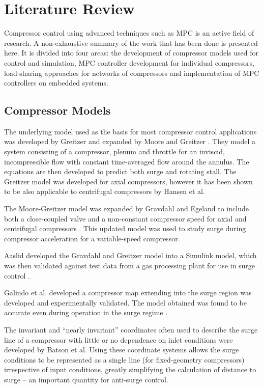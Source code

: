 \chapter{Literature Review}
Compressor control using advanced techniques such as MPC is an active field of research. 
A non-exhaustive summary of the work that has been done is presented here.
It is divided into four areas: the development of compressor models used for control and simulation, MPC controller development for individual compressors, load-sharing approaches for networks of compressors and implementation of MPC controllers on embedded systems. 

\section{Compressor Models}

The underlying model used as the basis for most compressor control applications was developed by Greitzer \cite{Greitzer1976} and expanded by Moore and Greitzer \cite{Moore1985}.
They model a system consisting of a compressor, plenum and throttle for an inviscid, incompressible flow with constant time-averaged flow around the annulus. 
The equations are then developed to predict both surge and rotating stall.
The Greitzer model was developed for axial compressors, however it has been shown to be also applicable to centrifugal compressors by Hansen et al. \cite{Hansen1981} 

The Moore-Greitzer model was expanded by Gravdahl and Egeland to include both a close-coupled valve and a non-constant compressor speed for axial and centrifugal compressors \cite{Gravdahl1999}. 
This updated model was used to study surge during compressor acceleration for a variable-speed compressor.

Aaslid developed the Gravdahl and Greitzer model into a Simulink model, which was then validated against test data from a gas processing plant for use in surge control \cite{Aaslid2009}. 

Galindo et al. developed a compressor map extending into the surge region was developed and experimentally validated. The model obtained was found to be accurate even during operation in the surge regime \cite{Galindo2008}.

The invariant and ``nearly invariant'' coordinates often used to describe the surge line of a compressor with little or no dependence on inlet conditions were developed by Batson et al. \cite{Batson1996}
Using these coordinate systems allows the surge conditions to be represented as a single line (for fixed-geometry compressors) irrespective of input conditions, greatly simplifying the calculation of distance to surge -- an important quantity for anti-surge control.

